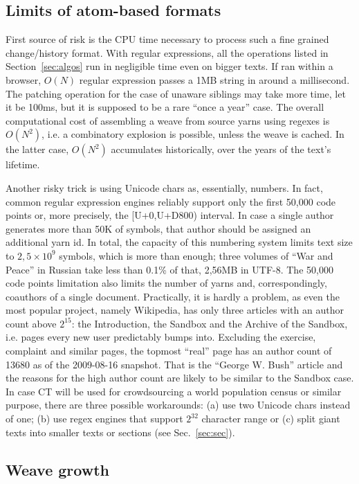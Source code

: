 \documentclass{sig-alternate}
\begin{document}
\subsection{Limits of atom-based formats} \label{sec:formats}
First source of risk is the CPU time necessary to process such a fine grained change/history format.
With regular expressions, all the operations listed in Section~\ref{sec:algos} run in negligible time even on bigger texts. 
If ran within a browser, $O(N)$ regular expression passes a 1MB string in around a millisecond.
The patching operation for the case of unaware siblings may take more time, let it be 100ms, but it is supposed to be a rare ``once a year'' case.
The overall computational cost of assembling a weave from source yarns using regexes is $O(N^{2})$, i.e. a combinatory explosion is possible, unless the weave is cached.
In the latter case, $O(N^{2})$ accumulates historically, over the years of the text's lifetime.

Another risky trick is using Unicode chars as, essentially, numbers.
In fact, common regular expression engines reliably support only the first 50,000 code points or, more precisely, the [U+0,U+D800) interval. 
In case a single author generates more than 50K of symbols, that author should be assigned an additional yarn id.
In total, the capacity of this numbering system limits text size to $2,5\times10^9$ symbols, which is more than enough; three volumes of ``War and Peace'' in Russian take less than 0.1\% of that, 2,56MB in UTF-8. 
The 50,000 code points limitation also limits the number of yarns and, correspondingly, coauthors of a single document.
Practically, it is hardly a problem, as even the most popular project, namely Wikipedia, has only three articles with an author count above $2^{15}$: the Introduction, the Sandbox and the Archive of the Sandbox, i.e. pages every new user predictably bumps into.
Excluding the exercise, complaint and similar pages, the topmost ``real'' page has an author count of 13680 as of the 2009-08-16 snapshot.
That is the ``George W. Bush'' article and the reasons for the high author count are likely to be similar to the Sandbox case.
In case CT will be used for crowdsourcing a world population census or similar purpose, there are three possible workarounds: (a) use two Unicode chars instead of one; (b) use regex engines that support $2^{32}$ character range or (c) split giant texts into smaller texts or sections (see Sec.~\ref{sec:sec}).

\subsection{Weave growth}	\label{sec:weave-growth}
\end{document}
